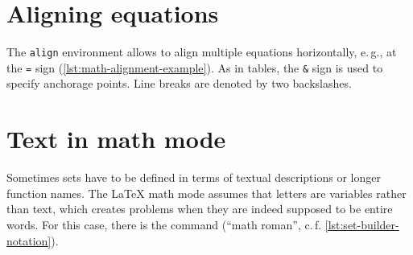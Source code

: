 
\section{Aligning equations}

The \texttt{align} environment allows to align multiple equations horizontally, e.\,g., at the \texttt{=} sign (\cref{lst:math-alignment-example}).
As in tables, the \texttt{\&} sign is used to specify anchorage points.
Line breaks are denoted by two backslashes.


\section{Text in math mode}

Sometimes sets have to be defined in terms of textual descriptions or longer function names.
The \LaTeX{} math mode assumes that letters are variables rather than text, which creates problems when they are indeed supposed to be entire words.
For this case, there is the \texttt{\mathrm{}} command (\enquote{math roman}, c.\,f. \cref{lst:set-builder-notation}).

